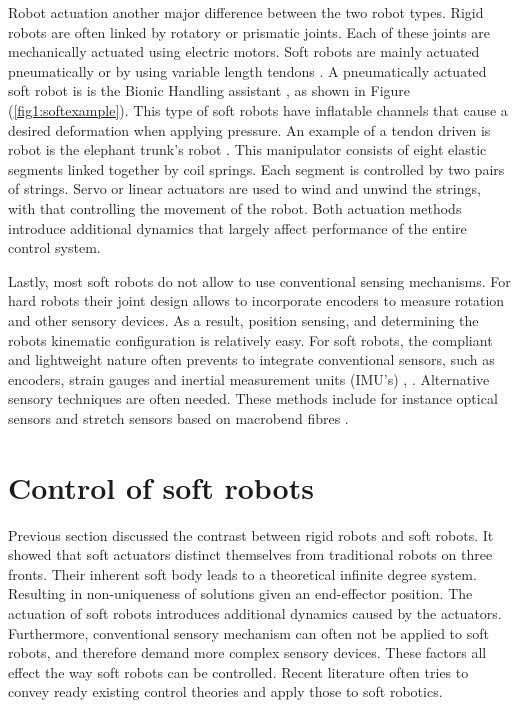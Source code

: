 Robot actuation another major difference between the two robot types. Rigid robots are often linked by rotatory or prismatic joints. Each of these joints are mechanically actuated using electric motors. Soft robots are mainly actuated pneumatically or by using variable length tendons \cite{Rus2015}. A pneumatically actuated soft robot is is the Bionic Handling assistant \cite{rolf2012constant}, as shown in Figure (\ref{fig1:softexample}). This type of soft robots have inflatable channels that cause a desired deformation when applying pressure. An example of a tendon driven is robot is the elephant trunk's robot \cite{cieslak1999elephant}. This manipulator consists of eight elastic segments linked together by coil springs. Each segment is controlled by two pairs of strings. Servo or linear actuators are used to wind and unwind the strings, with that controlling the movement of the robot. Both actuation methods introduce additional dynamics that largely affect performance of the entire control system. 

Lastly, most soft robots do not allow to use conventional sensing mechanisms. For hard robots their joint design allows to incorporate encoders to measure rotation and other sensory devices. As a result, position sensing, and determining the robots kinematic configuration is relatively easy. For soft robots, the compliant and lightweight nature often prevents to integrate conventional sensors, such as encoders, strain gauges and inertial measurement units (IMU's) \cite{Rus2015}, \cite{Lee2017}. Alternative sensory techniques are often needed. These methods include for instance optical sensors and stretch sensors based on macrobend fibres \cite{Sareh2015}.

\section{Control of soft robots}

Previous section discussed the contrast between rigid robots and soft robots. It showed that soft actuators distinct themselves from traditional robots on three fronts. Their inherent soft body leads to a theoretical infinite degree system. Resulting in non-uniqueness of solutions given an end-effector position. The actuation of soft robots introduces additional dynamics caused by the actuators. Furthermore, conventional sensory mechanism can often not be applied to soft robots, and therefore demand more complex sensory devices. These factors all effect the way soft robots can be controlled. Recent literature often tries to convey ready existing control theories and apply those to soft robotics.

